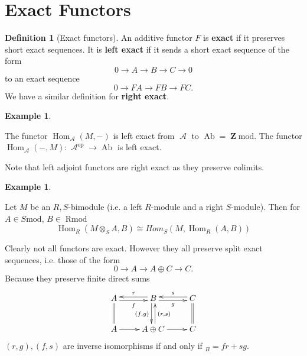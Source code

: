 \documentclass[10pt,]{book}
\newcommand{\terminology}[1]{\textbf{#1}}
\theoremstyle{plain}
\theoremstyle{definition}
\newtheorem{definition}[theorem]{Definition}
\newtheorem{example}[theorem]{Example}
\numberwithin{equation}{section}
\DeclareMathOperator{\Hom}{Hom}
\DeclareMathOperator{\op}{op}
\DeclareMathOperator{\Ab}{\text{Ab}}
\DeclareMathOperator{\Rmod}{R\text{mod}}
\DeclareMathOperator{\cA}{\mathcal{A}}
\DeclareMathOperator{\ZZ}{\mathbf{Z}}
\begin{document}
\section[Exact Functors]{Exact Functors}\label{sec-exact}
\begin{definition}[Exact functors]\label{definition-16}
An additive functor \(F\) is \terminology{exact} if it preserves short exact sequences.
            It is \terminology{left exact} if it sends a short exact sequence of the form
            \[
              0\to A \to B \to C \to 0
            \]
            to an exact sequence
            \[
              0 \to FA \to FB \to FC.
            \]
            We have a similar definition for \terminology{right exact}.
          \end{definition}
\begin{example}\label{example-7}

            The functor \(\Hom_{\cA}(M, -)\) is left exact from \(\cA\) to \(\Ab = \ZZ\text{mod}\).
            The functor \(\Hom_{\cA}( -, M)\colon \cA^{\op} \to\Ab\) is left exact.\newline{}\end{example}

          Note that left adjoint functors are right exact as they preserve colimits.
\begin{example}\label{example-8}

            Let \(M\) be an \(R,S\)-bimodule (i.e. a left \(R\)-module and a right \(S\)-module).
            Then for \(A \in S\text{mod}\), \(B\in \Rmod\)\[
              \Hom_{R}(M \otimes_S A, B) \cong Hom_{S}(M, \Hom_R(A,B))
            \]\end{example}
\par

          Clearly not all functors are exact.
          However they all preserve split exact sequences, i.e. those of the form
          \[0 \to A \to A\oplus C \to C.\]
          Because they preserve finite direct sums
          \[
            \xymatrix{
              A \ar@<-0.5ex>[r]_f \ar@{=}[d]& B\ar@<-0.5ex>[l]_r \ar@<-0.5ex>[d]_{(f,g)}  \ar@<-0.5ex>[r]_g & C\ar@<-0.5ex>[l]_s \ar@{=}[d]\\
              A \ar[r]& A \oplus C \ar@<-0.5ex>[u]_{(r,s)}\ar[r] &C
            }
          \]
          \((r,g),(f,s)\) are inverse isomorphisms if and only if \(_B = fr + sg\). 
\typeout{************************************************}
\typeout{************************************************}
\end{document}
